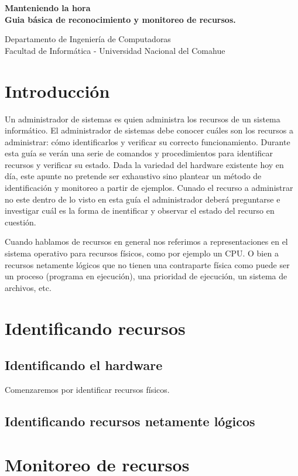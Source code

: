 \documentclass[12pt]{article}
\def\maketitle{

 \makeatletter
 {\color{bl} \centering \huge \sc \textbf{
 Manteniendo la hora \\ 
\large \vspace*{-8pt} \color{black} Guia básica de reconocimiento y monitoreo de recursos. 
 \vspace*{8pt} }\par}
 \makeatother


 \makeatletter
 {\centering \small 
 	Departamento de Ingeniería de Computadoras \\
 	Facultad de Informática - Universidad Nacional del Comahue \\
 	\vspace{20pt} }
 \makeatother

}
\begin{document}
\thispagestyle{empty}
\maketitle
\setlength{\parindent}{0pt}

\section*{Introducción}

Un administrador de sistemas es quien administra los recursos de un sistema informático. El administrador
de sistemas debe conocer cuáles son los recursos a administrar: cómo identificarlos y verificar su 
correcto funcionamiento. Durante esta guía se verán una serie de comandos y procedimientos para identificar 
recursos y verificar su estado. Dada la variedad del hardware existente hoy en día, este apunte no pretende
ser exhaustivo sino plantear un método de identificación y monitoreo a partir de ejemplos. Cunado 
el recurso a administrar no este dentro de lo visto en esta guía el administrador deberá preguntarse e
investigar cuál es la forma de inentificar y observar el estado del recurso en cuestión. 

Cuando hablamos de recursos en general nos referimos a representaciones en el sistema operativo para 
recursos físicos, como por ejemplo un CPU. O bien a recursos netamente lógicos que no tienen una
contraparte física como puede ser un proceso (programa en ejecución), una prioridad de ejecución, 
un sistema de archivos, etc. 


\section*{Identificando recursos}

\subsection*{Identificando el hardware}
Comenzaremos por identificar recursos físicos. 

\subsection*{Identificando recursos netamente lógicos}

\section*{Monitoreo de recursos}
\end{document}
